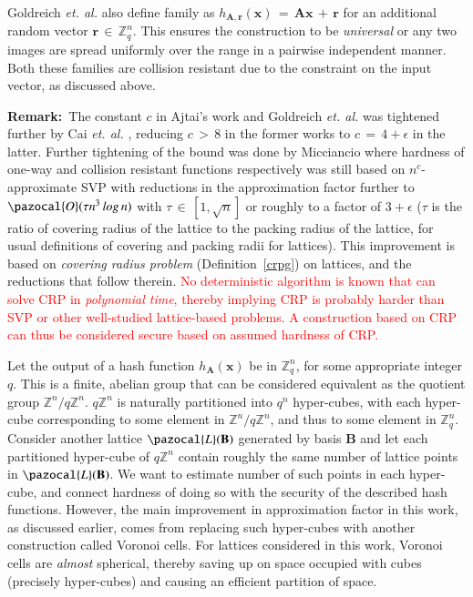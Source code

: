 \documentclass[10pt]{elsarticle}
\begin{document}
Goldreich \textit{et. al.} \cite{CRHF_Goldreich1996} also define
family as
$h_{\mathbf{A},\mathbf{r}}(\mathbf{x})\,=\,\mathbf{A}\mathbf{x}\,+\,\mathbf{r}$
for an additional random vector
$\mathbf{r}\,\in\,\mathbb{Z}_{q}^{n}$. This ensures the construction
to be \textit{universal} or any two images are spread uniformly over
the range in a pairwise independent manner. Both these families are
collision resistant due to the constraint on the input vector, as
discussed above.

\noindent\textbf{Remark:}~The constant $c$ in Ajtai's work
\cite{CRHF_Ajtai1996} and Goldreich \textit{et. al.}
\cite{CRHF_Goldreich1996} was tightened further by Cai \textit{et.
al.} \cite{CRHF_Cai1997}, \cite{CRHF_Cai1999} reducing $c\,>\,8$ in
the former works to $c\,=\,4+\epsilon$ in the latter. Further
tightening of the bound was done by Micciancio
\cite{CRHF_Micciancio2002} where hardness of one-way and collision
resistant functions respectively was still based on
$n^{c}$-approximate SVP with reductions in the approximation factor
further to $\pazocal{O}(\tau n^{3}\,log\,n)$ with $\tau \,\in\,
[1,\sqrt{n}]$ or roughly to a factor of $3+\epsilon$ ($\tau$ is the
ratio of covering radius of the lattice to the packing radius of the
lattice, for usual definitions of covering and packing radii for
lattices). This improvement is based on \emph{covering radius
problem} (Definition~\ref{crpg}) on lattices, and the reductions
that follow therein. \textcolor{red}{No deterministic algorithm is
known that can solve CRP in \textit{polynomial time}, thereby
implying CRP is probably harder than SVP or other well-studied
lattice-based problems. A construction based on CRP can thus be
considered secure based on assumed hardness of CRP.}

Let the output of a hash function $h_{\mathbf{A}}(\mathbf{x})$ be in
$\mathbb{Z}_{q}^{n}$, for some appropriate integer $q$. This is a
finite, abelian group that can be considered equivalent as the
quotient group $\mathbb{Z}^{n}/q\mathbb{Z}^{n}$. $q\mathbb{Z}^{n}$
is naturally partitioned into $q^{n}$ hyper-cubes, with each
hyper-cube corresponding to some element in
$\mathbb{Z}^{n}/q\mathbb{Z}^{n}$, and thus to some element in
$\mathbb{Z}_{q}^{n}$. Consider another lattice
$\pazocal{L}(\mathbf{B})$ generated by basis $\mathbf{B}$ and let
each partitioned hyper-cube of $q\mathbb{Z}^{n}$ contain roughly the
same number of lattice points in $\pazocal{L}(\mathbf{B})$. We want
to estimate number of such points in each hyper-cube, and connect
hardness of doing so with the security of the described hash
functions. However, the main improvement in approximation factor in
this work, as discussed earlier, comes from replacing such
hyper-cubes with another construction called Voronoi cells. For
lattices considered in this work, Voronoi cells are \textit{almost}
spherical, thereby saving up on space occupied with cubes (precisely
hyper-cubes) and causing an efficient partition of space.
\end{document}
